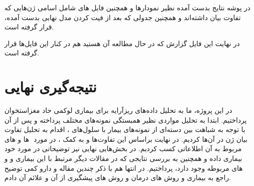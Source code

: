 \documentclass[12pt]{article}
\begin{document}
   در پوشه  نتایج بدست آمده نظیر نمودارها و همچنین فایل های  شامل اسامی ژ‌‌ن‌هایی که تفاوت بیان داشته‌اند و همچنین جدولی که بعد از فیت کردن مدل‌ نهایی بدست آمده، قرار گرفته است.
   
   در نهایت این فایل گزارش که در حال مطالعه آن هستید هم در کنار این فایل‌ها قرار گرفته است.
   

   \section{نتیجه‌گیری نهایی}
   
   در این پروژه، ما به تحلیل داده‌های ریزآرایه برای بیماری لوکمی حاد مغزاستخوان پرداختیم. ابتدا به تحلیل مواردی نظیر همبستگی نمونه‌های مختلف پرداخته و پس از آن با توجه به شباهت بین دسته‌ای از نمونه‌های بیمار با سلول‌های ، اقدام به تحلیل تفاوت بیان ژن در آن‌ها کردیم. در نهایت براساس این تفاوت‌ها و به کمک ، در مورد ‌ ها و  های مربوط به آن اطلاعاتی کسب کردیم. در بخش‌هایی نهایی نیز توضیحاتی در مورد خود بیماری  داده و همچنین به بررسی نتایجی که در مقالات دیگر مرتبط با این بیماری و  و  های مربوطه وجود دارد، پرداختیم.
   در انتها هم با ذکر چندین مقاله و دارو کمی توضیح راجع به بیماری و روش های درمان و روش های پیشگیری از آن و علائم آن دادم.
   
   
   
   


 \setLTRbibitems
\makeatletter
{}
\makeatother


\end{document}
